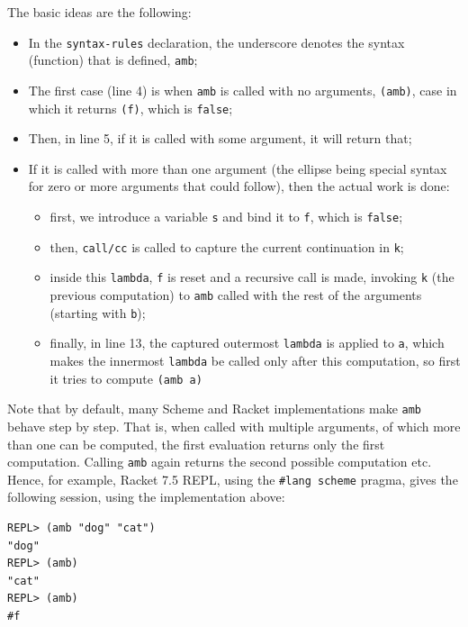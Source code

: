 The basic ideas are the following:
\begin{itemize}
\item In the \texttt{syntax-rules} declaration, the underscore denotes
  the syntax (function) that is defined, \texttt{amb};
\item The first case (line 4) is when \texttt{amb} is called with no arguments,
  \texttt{(amb)}, case in which it returns \texttt{(f)}, which is \texttt{false};
\item Then, in line 5, if it is called with some argument, it will return that;
\item If it is called with more than one argument (the ellipse being special
  syntax for zero or more arguments that could follow), then the actual work is done:
  \begin{itemize}
  \item first, we introduce a variable \texttt{s} and bind it to \texttt{f}, which is
    \texttt{false};
  \item then, \texttt{call/cc} is called to capture the current continuation in \texttt{k};
  \item inside this \texttt{lambda}, \texttt{f} is reset and a recursive call is made,
    invoking \texttt{k} (the previous computation) to \texttt{amb} called with the rest
    of the arguments (starting with \texttt{b});
  \item finally, in line 13, the captured outermost \texttt{lambda} is applied to \texttt{a},
    which makes the innermost \texttt{lambda} be called only after this computation, so
    first it tries to compute \texttt{(amb a)}
  \end{itemize}
\end{itemize}

\begin{remark}\label{rk:first-res}
  Note that by default, many Scheme and Racket implementations make \texttt{amb}
  behave step by step. That is, when called with multiple arguments, of which more
  than one can be computed, the first evaluation returns only the first computation.
  Calling \texttt{amb} again returns the second possible computation etc.
  Hence, for example, Racket 7.5 REPL, using the \texttt{\#lang scheme} pragma,
  gives the following session, using the implementation above:
  {
    \small
\begin{verbatim}
REPL> (amb "dog" "cat")
"dog"
REPL> (amb)
"cat"
REPL> (amb)
#f
\end{verbatim}
  }
\end{remark}

